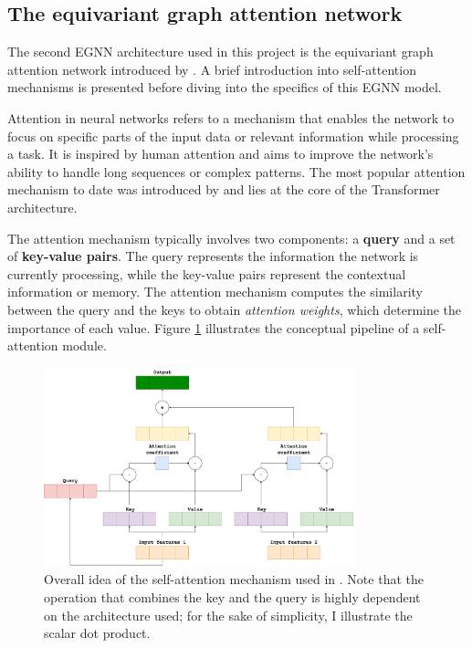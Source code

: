 \subsection{The equivariant graph attention network}
\label{eqgat-math}
The second EGNN architecture used in this project is the equivariant graph attention network introduced by \citet{eqgat}. A brief introduction into self-attention mechanisms is presented before diving into the specifics of this EGNN model.

Attention in neural networks refers to a mechanism that enables the network to focus on specific parts of the input data or relevant information while processing a task. It is inspired by human attention and aims to improve the network's ability to handle long sequences or complex patterns. The most popular attention mechanism to date was introduced by \citet{vaswani2017attention} and lies at the core of the Transformer architecture. 

The attention mechanism typically involves two components: a \textbf{query} and a set of \textbf{key-value pairs}. The query represents the information the network is currently processing, while the key-value pairs represent the contextual information or memory. The attention mechanism computes the similarity between the query and the keys to obtain \textit{attention weights}, which determine the importance of each value. Figure \ref{attention} illustrates the conceptual pipeline of a self-attention module.

\begin{figure}[!h]
    \centering
    \includegraphics[width=0.8\textwidth]{masters-report/figures/attention-mechanism.png}
    \caption{Overall idea of the self-attention mechanism used in \citet{vaswani2017attention}. Note that the operation that combines the key and the query is highly dependent on the architecture used; for the sake of simplicity, I illustrate the scalar dot product.}
    \label{attention}
\end{figure}

